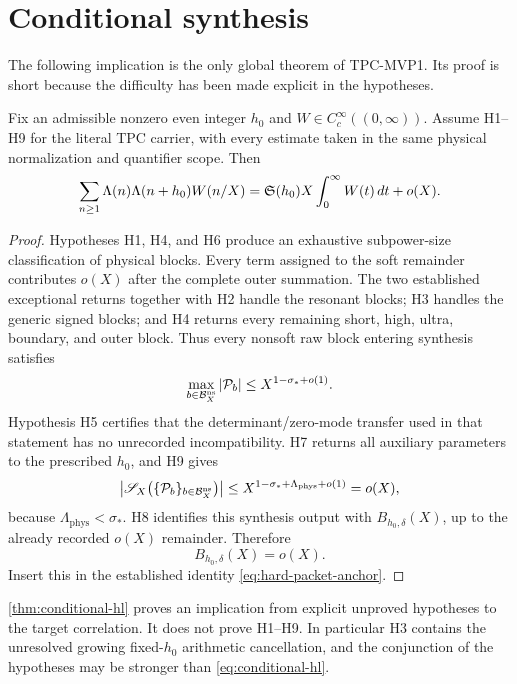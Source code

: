 \section{Conditional synthesis}
\label{sec:conditional}

The following implication is the only global theorem of TPC-MVP1.
Its proof is short because the difficulty has been made explicit in
the hypotheses.

\begin{theorem}
\label{thm:conditional-hl}
Fix an admissible nonzero even integer \(h_0\) and
\(W\in C_c^\infty((0,\infty))\).  Assume H1--H9 for the literal TPC
carrier, with every estimate taken in the same physical
normalization and quantifier scope.  Then
\begin{equation}
\sum_{n\ge1}\Lambda(n)\Lambda(n+h_0)W(n/X)
=
\mathfrak S(h_0)X\int_0^\infty W(t)\,dt+o(X).
\label{eq:conditional-hl}
\end{equation}
\end{theorem}

\begin{proof}
Hypotheses H1, H4, and H6 produce an exhaustive subpower-size
classification of physical blocks.  Every term assigned to the soft
remainder contributes \(o(X)\) after the complete outer summation.
The two established exceptional returns together with H2 handle the
resonant blocks; H3 handles the generic signed blocks; and H4 returns
every remaining short, high, ultra, boundary, and outer block.  Thus
every nonsoft raw block entering synthesis satisfies
\[
\max_{b\in\mathcal B_X^{\mathrm{ns}}}|\mathcal P_b|
\le X^{1-\sigma_*+o(1)}.
\]
Hypothesis H5 certifies that the determinant/zero-mode transfer used
in that statement has no unrecorded incompatibility.  H7 returns all
auxiliary parameters to the prescribed \(h_0\), and H9 gives
\[
\left|
\mathscr S_X\bigl(\{\mathcal P_b\}_{b\in\mathcal B_X^{\mathrm{ns}}}\bigr)
\right|
\le
X^{1-\sigma_*+\Lambda_{\mathrm{phys}}+o(1)}
=o(X),
\]
because \(\Lambda_{\mathrm{phys}}<\sigma_*\).  H8 identifies this
synthesis output with \(B_{h_0,\delta}(X)\), up to the already
recorded \(o(X)\) remainder.  Therefore
\[
B_{h_0,\delta}(X)=o(X).
\]
Insert this in the established identity
\eqref{eq:hard-packet-anchor}.
\end{proof}

\begin{remark}
\cref{thm:conditional-hl} proves an implication from explicit
unproved hypotheses to the target correlation.  It does not prove
H1--H9.  In particular H3 contains the unresolved growing
fixed-\(h_0\) arithmetic cancellation, and the conjunction of the
hypotheses may be stronger than \eqref{eq:conditional-hl}.
\end{remark}

